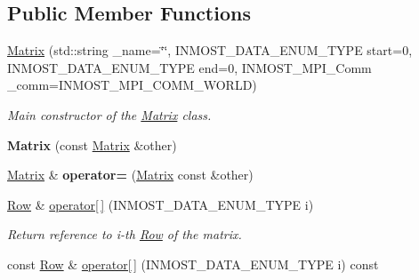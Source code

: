 \subsection*{Public Member Functions}
\begin{DoxyCompactItemize}
\item 
\hyperlink{classINMOST_1_1Solver_1_1Matrix_af5ab549b6c5c612fff68e61bf968ed40}{Matrix} (std\-::string \-\_\-name=\char`\"{}\char`\"{}, I\-N\-M\-O\-S\-T\-\_\-\-D\-A\-T\-A\-\_\-\-E\-N\-U\-M\-\_\-\-T\-Y\-P\-E start=0, I\-N\-M\-O\-S\-T\-\_\-\-D\-A\-T\-A\-\_\-\-E\-N\-U\-M\-\_\-\-T\-Y\-P\-E end=0, I\-N\-M\-O\-S\-T\-\_\-\-M\-P\-I\-\_\-\-Comm \-\_\-comm=I\-N\-M\-O\-S\-T\-\_\-\-M\-P\-I\-\_\-\-C\-O\-M\-M\-\_\-\-W\-O\-R\-L\-D)
\begin{DoxyCompactList}\small\item\em Main constructor of the \hyperlink{classINMOST_1_1Solver_1_1Matrix}{Matrix} class. \end{DoxyCompactList}\item 
\hypertarget{classINMOST_1_1Solver_1_1Matrix_a1ccc670e57a21487121b2105e7a50216}{{\bfseries Matrix} (const \hyperlink{classINMOST_1_1Solver_1_1Matrix}{Matrix} \&other)}\label{classINMOST_1_1Solver_1_1Matrix_a1ccc670e57a21487121b2105e7a50216}

\item 
\hypertarget{classINMOST_1_1Solver_1_1Matrix_af6197deff4e4af8515a3d882c63a88b7}{\hyperlink{classINMOST_1_1Solver_1_1Matrix}{Matrix} \& {\bfseries operator=} (\hyperlink{classINMOST_1_1Solver_1_1Matrix}{Matrix} const \&other)}\label{classINMOST_1_1Solver_1_1Matrix_af6197deff4e4af8515a3d882c63a88b7}

\item 
\hypertarget{classINMOST_1_1Solver_1_1Matrix_a449f4b05d5e6b69505d01f00aeba4abb}{\hyperlink{classINMOST_1_1Solver_1_1Row}{Row} \& \hyperlink{classINMOST_1_1Solver_1_1Matrix_a449f4b05d5e6b69505d01f00aeba4abb}{operator\mbox{[}$\,$\mbox{]}} (I\-N\-M\-O\-S\-T\-\_\-\-D\-A\-T\-A\-\_\-\-E\-N\-U\-M\-\_\-\-T\-Y\-P\-E i)}\label{classINMOST_1_1Solver_1_1Matrix_a449f4b05d5e6b69505d01f00aeba4abb}

\begin{DoxyCompactList}\small\item\em Return reference to i-\/th \hyperlink{classINMOST_1_1Solver_1_1Row}{Row} of the matrix. \end{DoxyCompactList}\item 
\hypertarget{classINMOST_1_1Solver_1_1Matrix_a9bb2c4634775ae7f34137b0045c538b3}{const \hyperlink{classINMOST_1_1Solver_1_1Row}{Row} \& \hyperlink{classINMOST_1_1Solver_1_1Matrix_a9bb2c4634775ae7f34137b0045c538b3}{operator\mbox{[}$\,$\mbox{]}} (I\-N\-M\-O\-S\-T\-\_\-\-D\-A\-T\-A\-\_\-\-E\-N\-U\-M\-\_\-\-T\-Y\-P\-E i) const }\label{classINMOST_1_1Solver_1_1Matrix_a9bb2c4634775ae7f34137b0045c538b3}


\end{DoxyCompactItemize}
